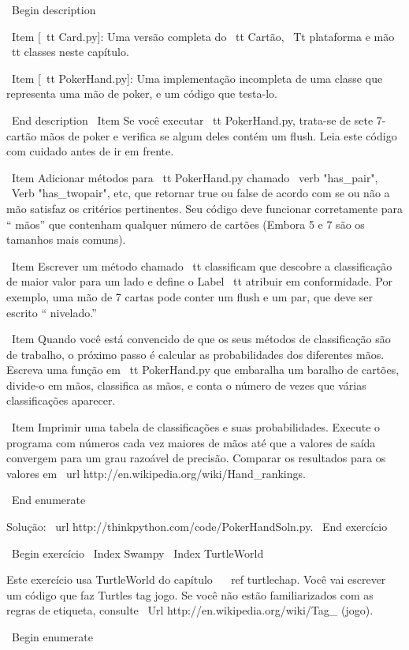 \documentclass[10pt]{book}
\begin{document}
\begin {itemize}
{{{{{{{{{{{{{{{{{\ Begin {description}

\ Item [{\ tt Card.py}]: Uma versão completa do {\ tt Cartão},
{\ Tt plataforma} e {mão \ tt} classes neste capítulo.

\ Item [{\ tt PokerHand.py}]: Uma implementação incompleta de uma classe
que representa uma mão de poker, e um código que testa-lo.

\ End {description}
%
\ Item Se você executar {\ tt PokerHand.py}, trata-se de sete 7-cartão mãos de poker
e verifica se algum deles contém um flush. Leia este
código com cuidado antes de ir em frente.

\ Item Adicionar métodos para {\ tt PokerHand.py} chamado \ verb "has_pair",
\ Verb "has_twopair", etc, que retornar true ou false de acordo com
se ou não a mão satisfaz os critérios pertinentes. Seu código deve
funcionar corretamente para `` mãos'' que contenham qualquer número de cartões
(Embora 5 e 7 são os tamanhos mais comuns).

\ Item Escrever um método chamado {\ tt classificam} que descobre
a classificação de maior valor para um lado e define o
{Label \ tt} atribuir em conformidade. Por exemplo, uma mão de 7 cartas
pode conter um flush e um par, que deve ser escrito `` nivelado.''

\ Item Quando você está convencido de que os seus métodos de classificação são
de trabalho, o próximo passo é calcular as probabilidades dos diferentes
mãos. Escreva uma função em {\ tt PokerHand.py} que embaralha um baralho de
cartões, divide-o em mãos, classifica as mãos, e conta o
número de vezes que várias classificações aparecer.

\ Item Imprimir uma tabela de classificações e suas probabilidades.
Execute o programa com números cada vez maiores de mãos até que a
valores de saída convergem para um grau razoável de precisão. Comparar
os resultados para os valores em \ url {http://en.wikipedia.org/wiki/Hand_rankings}.

\ End {enumerate}

Solução: \ url {http://thinkpython.com/code/PokerHandSoln.py}.
\ End {} exercício


\ Begin {} exercício
\ Index {} Swampy
\ Index {} TurtleWorld

Este exercício usa TurtleWorld do capítulo ~ \ ref {} turtlechap.
Você vai escrever um código que faz Turtles tag jogo. Se você
não estão familiarizados com as regras de etiqueta, consulte
\ Url {http://en.wikipedia.org/wiki/Tag_ (jogo)}.

\ Begin {enumerate}

}}}}}}}}}}}}}}}}}
\end{itemize}
\end{document}
